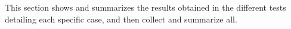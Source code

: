 This section shows and summarizes the results obtained in the different tests detailing each specific case, and then collect and summarize all.
